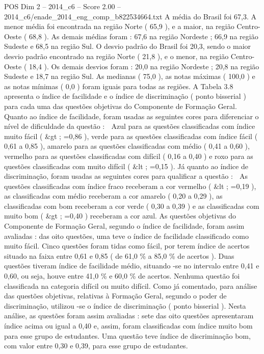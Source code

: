 \begin{textsample}{POS Dim 2 – 2014\_c6 – Score 2.00 – 2014\_c6/enade\_2014\_eng\_comp\_b822534664.txt}
A média do Brasil foi 67,3.
A menor média foi encontrada na região Norte ( 65,9 ), e a maior, na região Centro-Oeste ( 68,8 ).
As demais médias foram : 67,6 na região Nordeste ; 66,9 na região Sudeste e 68,5 na região Sul.
O desvio padrão do Brasil foi 20,3, sendo o maior desvio padrão encontrado na região Norte ( 21,8 ), e o menor, na região Centro-Oeste ( 18,4 ).
Os demais desvios foram : 20,0 na região Nordeste ; 20,8 na região Sudeste e 18,7 na região Sul.
As medianas ( 75,0 ), as notas máximas ( 100,0 ) e as notas mínimas ( 0,0 ) foram iguais para todas as regiões.
A Tabela 3.8 apresenta o índice de facilidade e o índice de discriminação ( ponto bisserial ) para cada uma das questões objetivas do Componente de Formação Geral.
Quanto ao índice de facilidade, foram usadas as seguintes cores para diferenciar o nível de dificuldade da questão :  Azul para as questões classificadas com índice muito fácil ( \&gt ; =0,86 ), verde para as questões classificadas com índice fácil ( 0,61 a 0,85 ), amarelo para as questões classificadas com médio ( 0,41 a 0,60 ), vermelho para as questões classificadas com difícil ( 0,16 a 0,40 ) e roxo para as questões classificadas com muito difícil ( \&lt ; =0,15 ).
Já quanto ao índice de discriminação, foram usadas as seguintes cores para qualificar a questão :  As questões classificadas com índice fraco receberam a cor vermelho ( \&lt ; =0,19 ), as classificadas com médio receberam a cor amarelo ( 0,20 a 0,29 ), as classificadas com bom receberam a cor verde ( 0,30 a 0,39 ) e as classificadas com muito bom ( \&gt ; =0,40 ) receberam a cor azul.
As questões objetivas do Componente de Formação Geral, segundo o índice de facilidade, foram assim avaliadas : das oito questões, uma teve o índice de facilidade classificado como muito fácil.
Cinco questões foram tidas como fácil, por terem índice de acertos situado na faixa entre 0,61 e 0,85 ( de 61,0 \% a 85,0 \% de acertos ).
Duas questões tiveram índice de facilidade médio, situando -se no intervalo entre 0,41 e 0,60, ou seja, houve entre 41,0 \% e 60,0 \% de acertos.
Nenhuma questão foi classificada na categoria difícil ou muito difícil.
Como já comentado, para análise das questões objetivas, relativas à Formação Geral, segundo o poder de discriminação, utilizou -se o índice de discriminação ( ponto bisserial ).
Nesta análise, as questões foram assim avaliadas : sete das oito questões apresentaram índice acima ou igual a 0,40 e, assim, foram classificadas com índice muito bom para esse grupo de estudantes.
Uma questão teve índice de discriminação bom, com valor entre 0,30 e 0,39, para esse grupo de estudantes.

\end{textsample}
